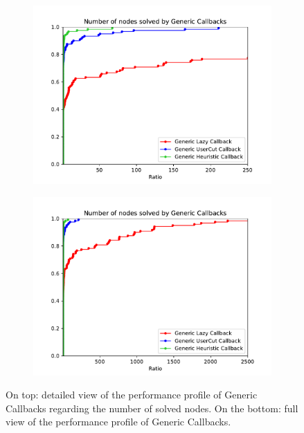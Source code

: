 \begin{figure}[h!]
  \centering
  \begin{subfigure}[b]{0.97\linewidth}
    \includegraphics[width=\linewidth]{media/NodesGeneric.pdf}
  \end{subfigure}
  \begin{subfigure}[b]{0.97\linewidth}
  \ContinuedFloat
    \includegraphics[width=\linewidth]{media/NodesGeneric1.pdf}
  \end{subfigure}
  \caption{On top: detailed view of the performance profile of Generic Callbacks regarding the number of solved nodes. On the bottom: full view of the performance profile of Generic Callbacks.}
    \label{fig:gennodes}
\end{figure}

